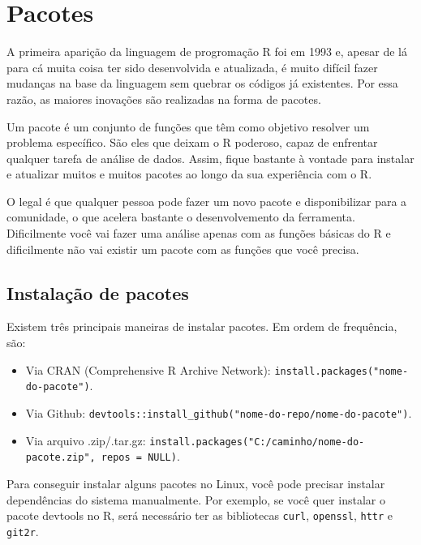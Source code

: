 \documentclass[
]{book}
\providecommand{\tightlist}{%
  \setlength{\itemsep}{0pt}\setlength{\parskip}{0pt}}
\begin{document}
\hypertarget{pacotes}{%
\chapter{Pacotes}\label{pacotes}}

A primeira aparição da linguagem de progromação R foi em 1993 e, apesar de lá para cá muita coisa ter sido desenvolvida e atualizada, é muito difícil fazer mudanças na base da linguagem sem quebrar os códigos já existentes. Por essa razão, as maiores inovações são realizadas na forma de pacotes.

Um pacote é um conjunto de funções que têm como objetivo resolver um problema específico. São eles que deixam o R poderoso, capaz de enfrentar qualquer tarefa de análise de dados. Assim, fique bastante à vontade para instalar e atualizar muitos e muitos pacotes ao longo da sua experiência com o R.

O legal é que qualquer pessoa pode fazer um novo pacote e disponibilizar para a comunidade, o que acelera bastante o desenvolvemento da ferramenta. Dificilmente você vai fazer uma análise apenas com as funções básicas do R e dificilmente não vai existir um pacote com as funções que você precisa.

\hypertarget{instalauxe7uxe3o-de-pacotes}{%
\section{Instalação de pacotes}\label{instalauxe7uxe3o-de-pacotes}}

Existem três principais maneiras de instalar pacotes. Em ordem de frequência, são:

\begin{itemize}
\tightlist
\item
  Via CRAN (Comprehensive R Archive Network): \texttt{install.packages("nome-do-pacote")}.
\item
  Via Github: \texttt{devtools::install\_github("nome-do-repo/nome-do-pacote")}.
\item
  Via arquivo .zip/.tar.gz: \texttt{install.packages("C:/caminho/nome-do-pacote.zip",\ repos\ =\ NULL)}.
\end{itemize}

Para conseguir instalar alguns pacotes no Linux, você pode precisar instalar dependências do sistema manualmente. Por exemplo, se você quer instalar o pacote devtools no R, será necessário ter as bibliotecas \texttt{curl}, \texttt{openssl}, \texttt{httr} e \texttt{git2r}.
\end{document}
